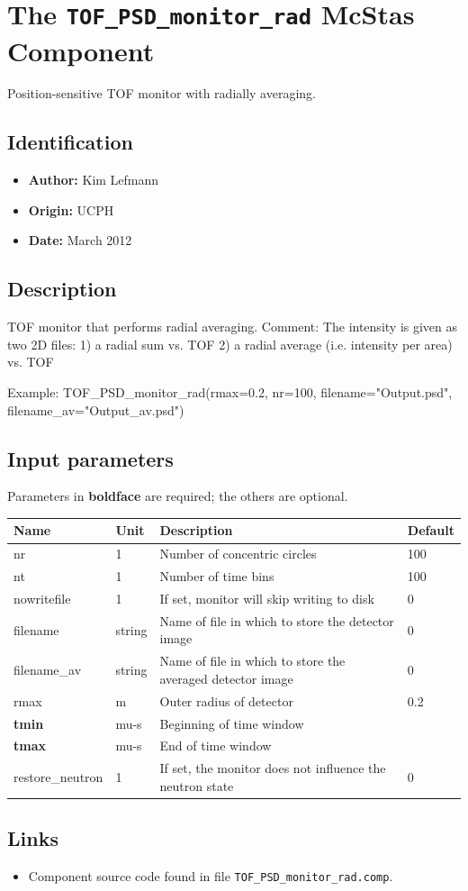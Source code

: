 \section{The \texttt{TOF\_PSD\_monitor\_rad} McStas Component}
Position-sensitive TOF monitor with radially averaging.

\subsection*{Identification}
\begin{itemize}
  \item \textbf{Author:} Kim Lefmann
  \item \textbf{Origin:} UCPH
  \item \textbf{Date:} March 2012
\end{itemize}

\subsection*{Description}
TOF monitor that performs radial averaging. Comment: The intensity is given as two 2D files: 1) a radial sum vs. TOF 2) a radial average (i.e. intensity per area) vs. TOF

Example: TOF\_PSD\_monitor\_rad(rmax=0.2, nr=100, filename="Output.psd", filename\_av="Output\_av.psd")

\subsection*{Input parameters}
Parameters in \textbf{boldface} are required; the others are optional.

\begin{longtable}{p{}p{}p{}p{}}
\toprule
\textbf{Name} & \textbf{Unit} & \textbf{Description} & \textbf{Default} \\
\midrule
\endhead
nr & 1 & Number of concentric circles & 100 \\
nt & 1 & Number of time bins & 100 \\
nowritefile & 1 & If set, monitor will skip writing to disk & 0 \\
filename & string & Name of file in which to store the detector image & 0 \\
filename\_av & string & Name of file in which to store the averaged detector image & 0 \\
rmax & m & Outer radius of detector & 0.2 \\
\textbf{tmin} & mu-s & Beginning of time window &  \\
\textbf{tmax} & mu-s & End of time window &  \\
restore\_neutron & 1 & If set, the monitor does not influence the neutron state & 0 \\
\bottomrule
\end{longtable}

\subsection*{Links}
\begin{itemize}
  \item Component source code found in file \texttt{TOF\_PSD\_monitor\_rad.comp}.
\end{itemize}
